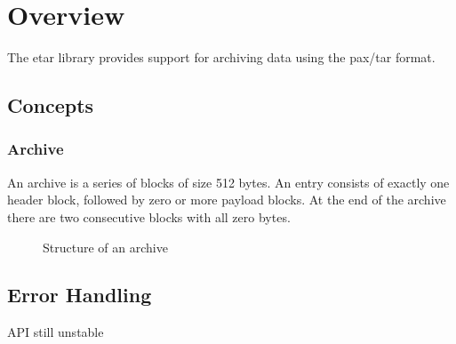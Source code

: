 \documentclass[a4paper]{report}
\begin{document}
\chapter{Overview}
The etar library provides support for archiving data using the pax/tar format.

\section{Concepts}
\subsection{Archive}
An archive is a series of blocks of size 512 bytes. An entry consists of exactly
one header block, followed by zero or more payload blocks. At the end of the
archive there are two consecutive blocks with all zero bytes.

\begin{figure}[h]
	\begin{center}
		
	\end{center}
	\caption{Structure of an archive}
\end{figure}

\section{Error Handling}
API still unstable







\printbibliography[heading=bibintoc]
\end{document}

